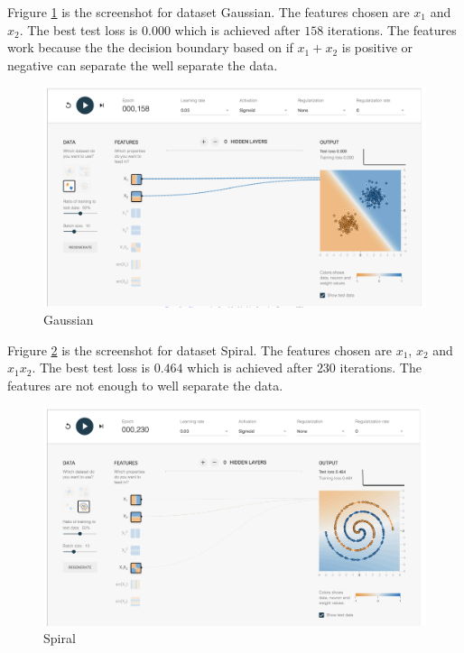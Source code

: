 \documentclass[11pt]{article}
\begin{document}
\begin{enumerate}
Frigure \ref{fig:gaussian} is the screenshot for dataset Gaussian. The features chosen are $x_1$ and $x_2$. The best test loss is $0.000$ which is achieved after $158$ iterations. The features work because the the decision boundary based on if $x_1 + x_2$ is positive or negative can separate the well separate the data.

\begin{figure}[!h]
  \centering
  \includegraphics[width=\linewidth]{figures/1_1/gaussian.png}
  \caption{Gaussian}
  \label{fig:gaussian}
\end{figure}


Frigure \ref{fig:spiral} is the screenshot for dataset Spiral. The features chosen are $x_1$, $x_2$ and $x_1x_2$. The best test loss is $0.464$ which is achieved after $230$ iterations. The features are not enough to well separate the data.

\begin{figure}[!h]
  \centering
  \includegraphics[width=\linewidth]{figures/1_1/spiral.png}
  \caption{Spiral}
  \label{fig:spiral}
\end{figure}


\end{enumerate}
\end{document}
